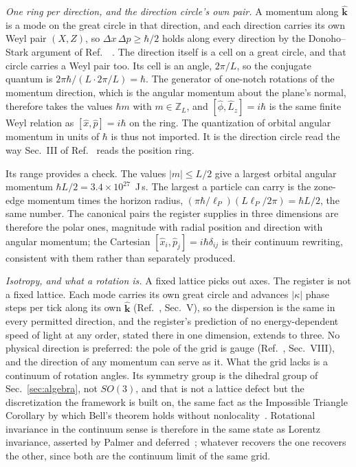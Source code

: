 \documentclass[aps,prd,twocolumn,superscriptaddress,nofootinbib]{revtex4-2}
\begin{document}
\textit{One ring per direction, and the direction circle's own pair.} A momentum along $\hat{\mathbf{k}}$ is a mode on the great circle in that direction, and each direction carries its own Weyl pair $(X,Z)$, so $\Delta x\,\Delta p \ge \hbar/2$ holds along every direction by the Donoho--Stark argument of Ref.~\cite{korytko2026c}~\cite{donoho1989,massar2008}. The direction itself is a cell on a great circle, and that circle carries a Weyl pair too. Its cell is an angle, $2\pi/L$, so the conjugate quantum is $2\pi\hbar/(L\cdot2\pi/L) = \hbar$. The generator of one-notch rotations of the momentum direction, which is the angular momentum about the plane's normal, therefore takes the values $\hbar m$ with $m\in\mathbb{Z}_L$, and $[\hat\phi,\hat L_z] = i\hbar$ is the same finite Weyl relation as $[\hat x,\hat p] = i\hbar$ on the ring. The quantization of orbital angular momentum in units of $\hbar$ is thus not imported. It is the direction circle read the way Sec.~III of Ref.~\cite{korytko2026c} reads the position ring.

Its range provides a check. The values $|m| \le L/2$ give a largest orbital angular momentum $\hbar L/2 = 3.4\times10^{27}$~J\,s. The largest a particle can carry is the zone-edge momentum times the horizon radius, $(\pi\hbar/\ell_P)(L\ell_P/2\pi) = \hbar L/2$, the same number. The canonical pairs the register supplies in three dimensions are therefore the polar ones, magnitude with radial position and direction with angular momentum; the Cartesian $[\hat x_i,\hat p_j] = i\hbar\delta_{ij}$ is their continuum rewriting, consistent with them rather than separately produced.

\textit{Isotropy, and what a rotation is.} A fixed lattice picks out axes. The register is not a fixed lattice. Each mode carries its own great circle and advances $|\kappa|$ phase steps per tick along its own $\hat{\mathbf{k}}$ (Ref.~\cite{korytko2026c}, Sec.~V), so the dispersion is the same in every permitted direction, and the register's prediction of no energy-dependent speed of light at any order, stated there in one dimension, extends to three. No physical direction is preferred: the pole of the grid is gauge (Ref.~\cite{korytko2026c}, Sec.~VIII), and the direction of any momentum can serve as it. What the grid lacks is a continuum of rotation angles. Its symmetry group is the dihedral group of Sec.~\ref{sec:algebra}, not $SO(3)$, and that is not a lattice defect but the discretization the framework is built on, the same fact as the Impossible Triangle Corollary by which Bell's theorem holds without nonlocality~\cite{palmer2020,palmer2026b}. Rotational invariance in the continuum sense is therefore in the same state as Lorentz invariance, asserted by Palmer and deferred~\cite{palmer2026c}; whatever recovers the one recovers the other, since both are the continuum limit of the same grid.
\end{document}

